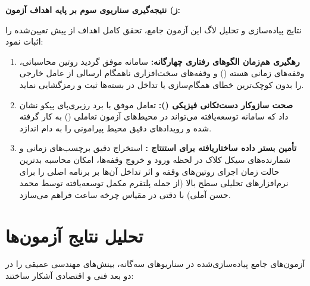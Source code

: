 \vspace{0.4cm}
\noindent
\textbf{ز) نتیجه‌گیری سناریوی سوم بر پایه اهداف آزمون:}\par
نتایج پیاده‌سازی و تحلیل لاگ این آزمون جامع، تحقق کامل اهداف از پیش تعیین‌شده را اثبات نمود:
\begin{enumerate}
    \item \textbf{رهگیری هم‌زمان الگوهای رفتاری چهارگانه:} سامانه موفق گردید روتین محاسباتی، وقفه‌های زمانی هسته () و وقفه‌های سخت‌افزاری ناهمگام ارسالی از عامل خارجی را بدون کوچک‌ترین خطای همگام‌سازی یا تداخل در بسته‌ها ثبت و رمزگشایی نماید.
    \item \textbf{صحت سازوکار دست‌تکانی فیزیکی ():} تعامل موفق با برد رزبری‌پای پیکو نشان داد که سامانه توسعه‌یافته می‌تواند در محیط‌های آزمون تعاملی () به کار گرفته شده و رویدادهای دقیق محیط پیرامونی را به دام اندازد.
    \item \textbf{تأمین بستر داده ساختاریافته برای استنتاج :} استخراج دقیق برچسب‌های زمانی و شمارنده‌های سیکل کلاک در لحظه ورود و خروج وقفه‌ها، امکان محاسبه بدترین حالت زمان اجرای روتین‌های وقفه و اثر تداخل آن‌ها بر برنامه اصلی را برای نرم‌افزارهای تحلیلی سطح بالا (از جمله پلتفرم مکمل توسعه‌یافته توسط محمد حسن آملی) با دقتی در مقیاس چرخه ساعت فراهم می‌سازد.
\end{enumerate}

\section{تحلیل نتایج آزمون‌ها}
\label{sec:evaluation_discussion}
آزمون‌های جامع پیاده‌سازی‌شده در سناریوهای سه‌گانه، بینش‌های مهندسی عمیقی را در دو بعد فنی و اقتصادی آشکار ساختند:

